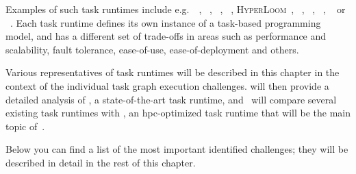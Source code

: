 Examples of such task runtimes include e.g.\ \dask~\cite{dask},
\parsl~\cite{parsl}, \ray~\cite{ray},
\pycompss~\cite{pycompss}, \textsc{HyperLoom}~\cite{hyperloom},
\gnuparallel~\cite{parallel}, \snakemake~\cite{snakemake},
\merlin~\cite{merlin},
\autosubmit~\cite{autosubmit} or \fireworks~\cite{fireworks}. Each task runtime
defines its own instance of a task-based programming model, and has a different set of trade-offs
in areas such as performance and scalability, fault tolerance, ease-of-use, ease-of-deployment and
others.

Various representatives of task runtimes will be described in this chapter in the context of the
individual task graph execution challenges.  will then provide a detailed
analysis of \dask{}, a state-of-the-art task runtime, and~
will compare several existing task runtimes with \hyperqueue{}, an
\gls{hpc}-optimized task runtime that will be the main topic
of~.

Below you can find a list of the most important identified challenges; they will be described in
detail in the rest of this chapter.

